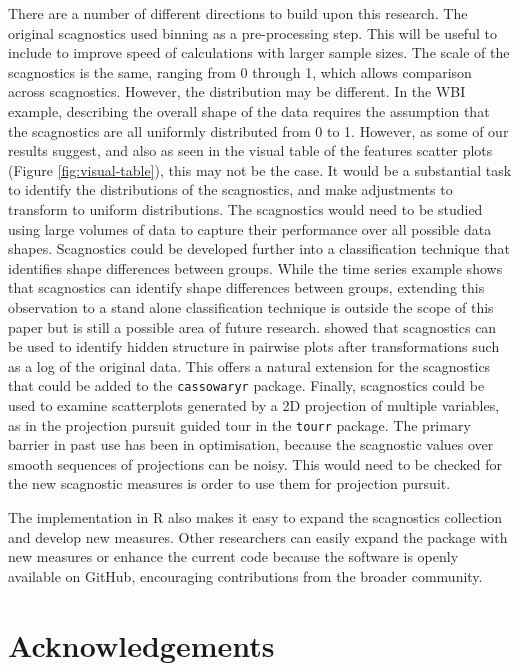 There are a number of different directions to build upon this research. The original scagnostics used binning as a pre-processing step. This will be useful to include to improve speed of calculations with larger sample sizes. The scale of the scagnostics is the same, ranging from 0 through 1, which allows comparison across scagnostics. However, the distribution may be different. In the WBI example, describing the overall shape of the data requires the assumption that the scagnostics are all uniformly distributed from 0 to 1. However, as some of our results suggest, and also as seen in the visual table of the features scatter plots (Figure \ref{fig:visual-table}), this may not be the case. It would be a substantial task to identify the distributions of the scagnostics, and make adjustments to transform to uniform distributions. The scagnostics would need to be studied using large volumes of data to capture their performance over all possible data shapes. Scagnostics could be developed further into a classification technique that identifies shape differences between groups. While the time series example shows that scagnostics can identify shape differences between groups, extending this observation to a stand alone classification technique is outside the scope of this paper but is still a possible area of future research. \citet{hidscags} showed that scagnostics can be used to identify hidden structure in pairwise plots after transformations such as a log of the original data. This offers a natural extension for the scagnostics that could be added to the \texttt{cassowaryr} package. Finally, scagnostics could be used to examine scatterplots generated by a 2D projection of multiple variables, as in the projection pursuit guided tour in the \texttt{tourr} package. The primary barrier in past use has been in optimisation, because the scagnostic values over smooth sequences of projections can be noisy. This would need to be checked for the new scagnostic measures is order to use them for projection pursuit.

The implementation in R also makes it easy to expand the scagnostics collection and develop new measures. Other researchers can easily expand the package with new measures or enhance the current code because the software is openly available on GitHub, encouraging contributions from the broader community.

\section{Acknowledgements}\label{acknowledgements}

